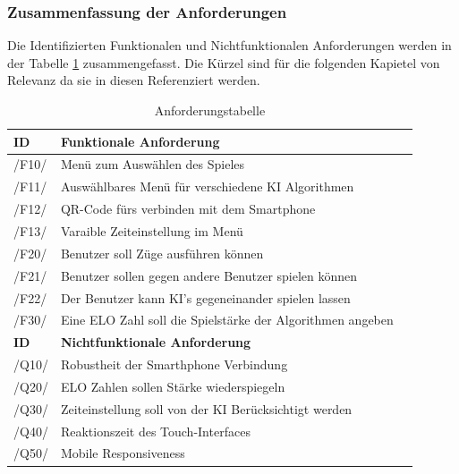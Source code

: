 \documentclass[12pt,a4paper,bibliography=totocnumbered,listof=totocnumbered]{article}
\begin{document}
\begin{appendix}
\subsubsection{Zusammenfassung der Anforderungen}
Die Identifizierten Funktionalen und Nichtfunktionalen Anforderungen werden in der Tabelle \ref{tab:Anforderungen} zusammengefasst. 
Die Kürzel sind für die folgenden Kapietel von Relevanz da sie in diesen Referenziert werden.
\vspace{1em}
\begin{table}[!h]
	\centering
	\begin{tabular}{|l|l|l|}
		\hline
		\textbf{ID} & \textbf{Funktionale Anforderung}\\
		\hline
		/F10/ & Menü zum Auswählen des Spieles \\
		\hline
		/F11/ & Auswählbares Menü für verschiedene KI Algorithmen \\
		\hline
        /F12/ & QR-Code fürs verbinden mit dem Smartphone \\
		\hline
		/F13/ & Varaible Zeiteinstellung im Menü \\
        \hline
		/F20/ & Benutzer soll Züge ausführen können \\
        \hline
		/F21/ & Benutzer sollen gegen andere Benutzer spielen können \\
        \hline
		/F22/ & Der Benutzer kann KI's gegeneinander spielen lassen \\
        \hline
		/F30/ & Eine ELO Zahl soll die Spielstärke der Algorithmen angeben \\
	
		\hline
		\textbf{ID} & \textbf{Nichtfunktionale Anforderung}\\
		\hline
		/Q10/ & Robustheit der Smarthphone Verbindung \\
        \hline
		/Q20/ & ELO Zahlen sollen Stärke wiederspiegeln \\
        \hline
		/Q30/ & Zeiteinstellung soll von der KI Berücksichtigt werden \\
        \hline
		/Q40/ & Reaktionszeit des Touch-Interfaces \\
        \hline
		/Q50/ & Mobile Responsiveness \\
		\hline
	\end{tabular}
	\caption{Anforderungstabelle}
	\label{tab:Anforderungen}
\end{table}


\end{appendix}
\end{document}

